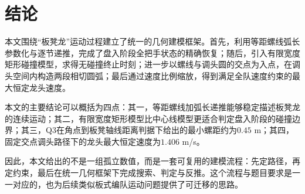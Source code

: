 \section{结论}
本文围绕“板凳龙”运动过程建立了统一的几何建模框架。首先，利用等距螺线弧长参数化与逐节递推，完成了盘入阶段全把手状态的精确恢复；随后，引入有限宽度矩形碰撞模型，求得无碰撞终止时刻；进一步以螺线与调头圆的交点为入点，在调头空间内构造两段相切圆弧；最后通过速度比例缩放，得到满足全队速度约束的最大恒定龙头速度。

本文的主要结论可以概括为四点：其一，等距螺线加弧长递推能够稳定描述板凳龙的连续运动；其二，有限宽度矩形模型比中心线模型更适合判定盘入阶段的碰撞边界；其三，Q3在角点到板凳轴线距离判据下给出的最小螺距约为$0.45$ m；其四，固定交点调头路径下的龙头最大恒定速度为$1.406$ m/s。

因此，本文给出的不是一组孤立数值，而是一套可复用的建模流程：先定路径，再定约束，最后在统一几何框架下完成搜索、判定与反推。这个流程与题目要求是一一对应的，也为后续类似板式编队运动问题提供了可迁移的思路。
